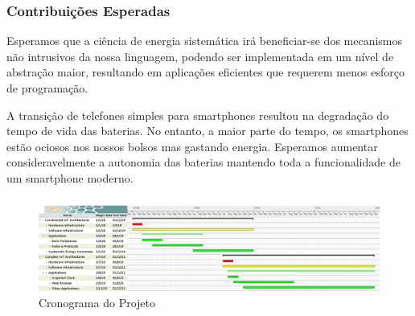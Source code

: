 \documentclass[12pt,english]{amsart}
\begin{document}
\subsubsection{\textbf{Contribuições Esperadas}}

Esperamos que a ciência de energia sistemática irá beneficiar-se dos mecanismos
não intrusivos da nossa linguagem, podendo ser implementada em um nível de
abstração maior, resultando em aplicações eficientes que requerem menos esforço
de programação.

A transição de telefones simples para smartphones resultou na degradação do
tempo de vida das baterias.
No entanto, a maior parte do tempo, os smartphones estão ociosos nos nossos
bolsos mas gastando energia.
Esperamos aumentar consideravelmente a autonomia das baterias mantendo toda a
funcionalidade de um smartphone moderno.

\begin{figure}
    \vspace{17cm}
    \includegraphics[width=\columnwidth]{serra-big}
    \caption{Cronograma do Projeto
        \label{fig.timeline}
    }
\end{figure}

\newpage


\end{document}
